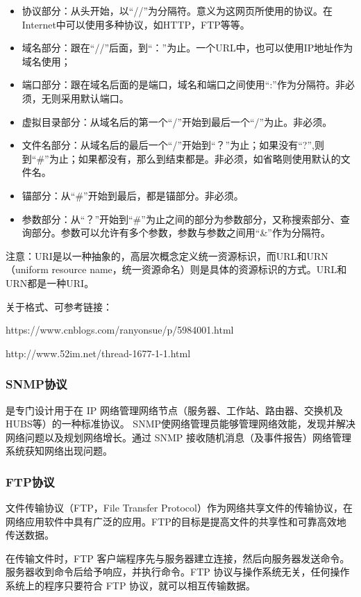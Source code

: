 \documentclass[UTF8]{article}%
\begin{document}
\begin{itemize}
    \item 协议部分：从头开始，以“//”为分隔符。意义为这网页所使用的协议。在Internet中可以使用多种协议，如HTTP，FTP等等。
    \item 域名部分：跟在“//”后面，到“：”为止。一个URL中，也可以使用IP地址作为域名使用；
    \item 端口部分：跟在域名后面的是端口，域名和端口之间使用“:”作为分隔符。非必须，无则采用默认端口。
    \item 虚拟目录部分：从域名后的第一个“/”开始到最后一个“/”为止。非必须。
    \item 文件名部分：从域名后的最后一个“/”开始到“？”为止；如果没有“?”,则到“\#”为止；如果都没有，那么到结束都是。非必须，如省略则使用默认的文件名。
    \item 锚部分：从“\#”开始到最后，都是锚部分。非必须。
    \item 参数部分：从“？”开始到“\#”为止之间的部分为参数部分，又称搜索部分、查询部分。参数可以允许有多个参数，参数与参数之间用“\&”作为分隔符。
\end{itemize}

注意：URI是以一种抽象的，高层次概念定义统一资源标识，而URL和URN（uniform resource name，统一资源命名）则是具体的资源标识的方式。URL和URN都是一种URI。

关于格式、可参考链接：

https://www.cnblogs.com/ranyonsue/p/5984001.html

http://www.52im.net/thread-1677-1-1.html

\subsubsection{SNMP协议}

是专门设计用于在 IP 网络管理网络节点（服务器、工作站、路由器、交换机及HUBS等）的一种标准协议。 SNMP使网络管理员能够管理网络效能，发现并解决网络问题以及规划网络增长。通过 SNMP 接收随机消息（及事件报告）网络管理系统获知网络出现问题。

\subsubsection{FTP协议}

文件传输协议（FTP，File Transfer Protocol）作为网络共享文件的传输协议，在网络应用软件中具有广泛的应用。FTP的目标是提高文件的共享性和可靠高效地传送数据。

在传输文件时，FTP 客户端程序先与服务器建立连接，然后向服务器发送命令。服务器收到命令后给予响应，并执行命令。FTP 协议与操作系统无关，任何操作系统上的程序只要符合 FTP 协议，就可以相互传输数据。
\end{document}
